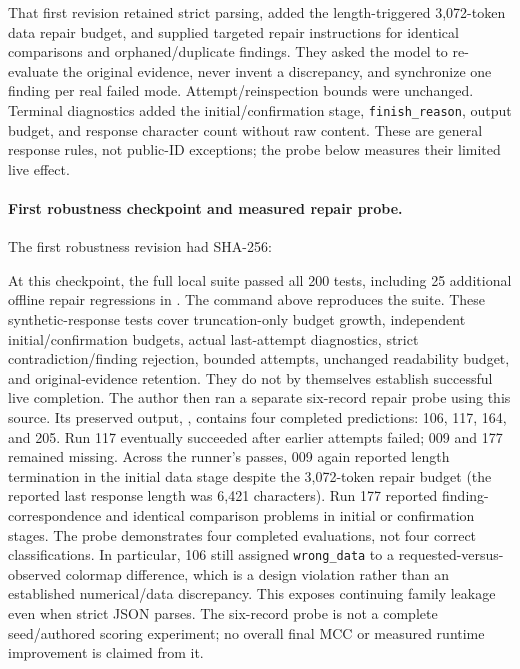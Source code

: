 \documentclass[11pt]{article}
\begin{document}
That first revision retained strict parsing, added the length-triggered
3,072-token data repair budget, and supplied targeted repair instructions
for identical comparisons and orphaned/duplicate findings. They asked
the model to re-evaluate the original evidence, never invent a discrepancy,
and synchronize one finding per real failed mode. Attempt/reinspection
bounds were unchanged. Terminal diagnostics added the initial/confirmation
stage, \texttt{finish\_reason}, output budget, and response character count
without raw content. These are general response rules, not public-ID
exceptions; the probe below measures their limited live effect.

\paragraph{First robustness checkpoint and measured repair probe.}
The first robustness revision had SHA-256:
\begin{quote}
\small
{}
\end{quote}
At this checkpoint, the full local suite passed all 200 tests, including
25 additional offline repair regressions in
. The command above reproduces the
suite. These synthetic-response tests cover truncation-only budget
growth, independent initial/confirmation budgets, actual last-attempt
diagnostics, strict contradiction/finding rejection, bounded attempts,
unchanged readability budget, and original-evidence retention. They do
not by themselves establish successful live completion.
The author then ran a separate six-record repair probe using this source.
Its preserved output,
, contains
four completed predictions: 106, 117, 164, and 205.
Run 117 eventually succeeded after earlier attempts failed;
009 and 177 remained missing. Across the runner's passes, 009 again
reported length termination in the initial data stage despite the
3,072-token repair budget (the reported last response length was
6,421 characters). Run 177 reported finding-correspondence and identical
comparison problems in initial or confirmation stages.
The probe demonstrates four completed evaluations, not four correct
classifications. In particular, 106 still assigned \texttt{wrong\_data}
to a requested-versus-observed colormap difference, which is a design
violation rather than an established numerical/data discrepancy.
This exposes continuing family leakage even when strict JSON parses.
The six-record probe is not a complete seed/authored scoring experiment;
no overall final MCC or measured runtime improvement is claimed from it.
\end{document}
